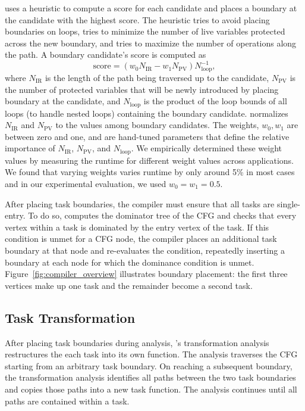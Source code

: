 \sys uses a heuristic to compute a score for each candidate and places a
boundary at the candidate with the highest score. The heuristic tries to avoid
placing boundaries on loops, tries to minimize the number of live variables 
protected across the new boundary, and tries to maximize the number of operations
along the path. A boundary candidate's score is computed as
%
\begin{equation}
\text{score} = {\left(w_{0} N_{\text{IR}} - w_{1} N_{\text{PV}}\right)}{N_{\text{loop}}^{-1}},\nonumber
\end{equation}
%
where $N_{\text{IR}}$ is the length of the path being traversed up to the
candidate, $N_{\text{PV}}$ is the number of protected variables that will be
newly introduced by placing boundary at the candidate, and $N_{\text{loop}}$ is
the product of the loop bounds of all loops (to handle nested loops) containing the
boundary candidate. \sys normalizes $N_{\text{IR}}$ and $N_{\text{PV}}$ to the
values among boundary candidates. The weights, $w_{0}, w_{1}$ are between zero
and one, and are hand-tuned parameters that define the relative importance of
$N_{\text{IR}}$, $N_{\text{PV}}$, and $N_{\text{loop}}$. We empirically determined these weight values by measuring the runtime for different weight values across
applications. We found that varying weights varies runtime by only around 5\%
in most cases and in our experimental evaluation, we used $w_{0} = w_{1} =
0.5$.

After placing task boundaries, the compiler must ensure that all tasks are
single-entry. To do so, \sys computes the dominator tree of the CFG and checks
that every vertex within a task is dominated by the entry vertex of the task.
If this condition is unmet for a CFG node, the compiler places an
additional task boundary at that node and re-evaluates the condition, repeatedly
inserting a boundary at each node for which the dominance condition is unmet.
Figure~\ref{fig:compiler_overview} illustrates boundary placement: the first
three vertices make up one task and the remainder become a second task.

\subsection{Task Transformation}
\label{sec:compiler_transform_pass}

After placing task boundaries during analysis, \sys's transformation analysis
restructures the each task into its own function. The analysis traverses the CFG starting from an arbitrary task boundary. On reaching a subsequent boundary, the transformation analysis identifies all paths between the two task boundaries and copies those paths into a new task function. The analysis continues until all paths are contained within a task. 

